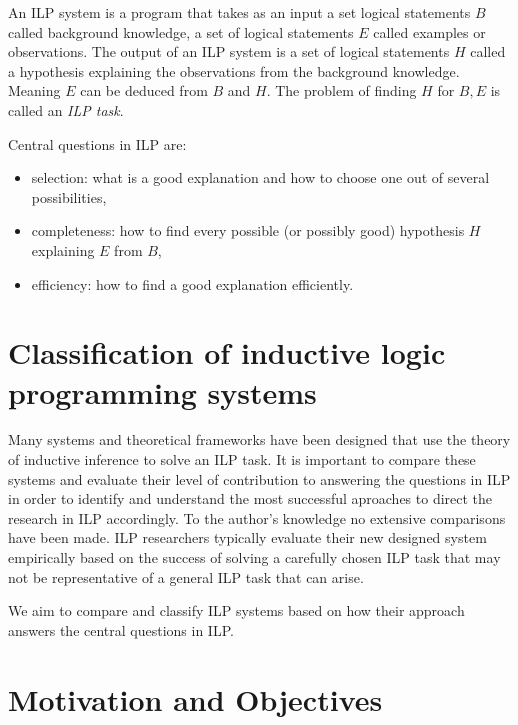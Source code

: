 An ILP system is a program that takes as an input a set logical statements $B$ called background knowledge, a set of logical statements $E$ called examples or observations. The output of an ILP system is a set of logical statements $H$ called a hypothesis explaining the observations from the background knowledge. Meaning $E$ can be deduced from $B$ and $H$. The problem of finding $H$ for $B, E$ is called an \emph{ILP task}.

Central questions in ILP are:
\begin{itemize}
\item selection: what is a good explanation and how to choose one out of several possibilities,
\item completeness: how to find every possible (or possibly good) hypothesis $H$ explaining $E$ from $B$,
\item efficiency: how to find a good explanation efficiently. 
\end{itemize}

\section{Classification of inductive logic programming systems}
Many systems and theoretical frameworks have been designed that use the theory of inductive inference to solve an ILP task. It is important to compare these systems and evaluate their level of contribution to answering the questions in ILP in order to identify and understand the most successful aproaches to direct the research in ILP accordingly. To the author's knowledge no extensive comparisons have been made. ILP researchers typically evaluate their new designed system empirically based on the success of solving a carefully chosen ILP task that may not be representative of a general ILP task that can arise.

We aim to compare and classify ILP systems based on how their approach answers the central questions in ILP.

\section{Motivation and Objectives}

